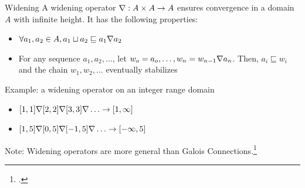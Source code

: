 \documentclass[aspectratio=169]{beamer}
\begin{document}
\begin{frame}{Widening}
  \small
  A widening operator $\nabla : A \times A \to A$ ensures convergence
  in a domain $A$ with infinite height. It has the following
  properties:\vspace{-0.3em}
  \begin{itemize}\footnotesize
  \item $\forall a_1, a_2 \in A, a_1 \sqcup a_2 \sqsubseteq a_1 \nabla a_2$
  \item For any sequence $a_1, a_2, \ldots$, let $w_o = a_o, \ldots, w_n = w_{n-1} \nabla a_n$. Then, $a_i \sqsubseteq w_i$ and the chain $w_1, w_2, \ldots$ eventually stabilizes
  \end{itemize}\pause\vspace{-0.3em}
  \begin{exampleblock}{\small Example: a widening operator on an integer range domain}
    \vspace{-0.8em}
  \begin{itemize}[<+->]\footnotesize
  \item $[1,1] \nabla [2,2] \nabla [3,3] \nabla \ldots \to [1, \infty]$
  \item $[1,5] \nabla [0,5] \nabla [-1,5] \nabla \ldots \to [-\infty, 5]$
  \end{itemize}
\end{exampleblock}\vspace{-1.6em}\pause
Note: Widening operators are more general than Galois Connections.\footcite{cousot92comparing}\vspace{1em}
\end{frame}


\end{document}
